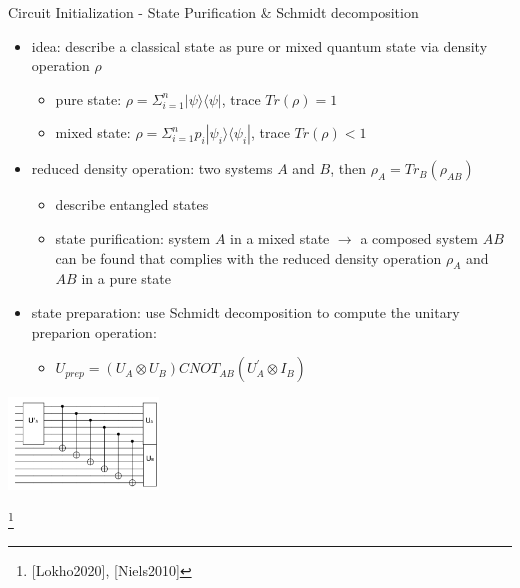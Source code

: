 \begin{frame}{Circuit Initialization - State Purification \& Schmidt decomposition}
  \begin{minipage}{1.0\textwidth}
    \begin{itemize}
      \item idea: describe a classical state as pure or mixed quantum state via density operation $\rho$
      \begin{itemize}
        \item pure state: $\rho = \Sigma_{i=1}^{n} |\psi\rangle \langle\psi |$, trace $Tr(\rho) = 1$
        \item mixed state: $\rho = \Sigma_{i=1}^{n} p_i |\psi_i\rangle \langle\psi_i |$, trace $Tr(\rho) < 1$
      \end{itemize}
      \item reduced density operation: two systems $A$ and $B$, then $\rho_{A} = Tr_B(\rho_{AB})$
      \begin{itemize}
        \item describe entangled states
        \item state purification: system $A$ in a mixed state $\rightarrow$ a composed system $AB$ can be found that complies with the reduced density operation $\rho_{A}$ and $AB$ in a pure state
      \end{itemize}
			\item state preparation: use Schmidt decomposition to compute the unitary preparion operation:
			\begin{itemize}
				\item $U_{prep} = (U_A \otimes U_B) CNOT_{AB} (U_{A}^{'} \otimes I_B )$
			\end{itemize}
    \end{itemize}
  \end{minipage}
	\begin{minipage}{1.0\textwidth}
    \centering
    \includegraphics[width=0.3\textwidth]{../assets/schmidt_decomposition_main-ref19.png}
  \end{minipage}
	\footnote{[Lokho2020], [Niels2010]}
\end{frame}


